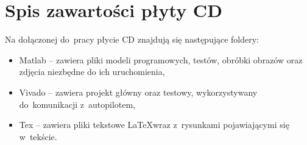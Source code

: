 \documentclass[11pt]{aghdpl}
\begin{document}
% 
% 

\printbibliography

\appendix
\chapter{Spis zawartości płyty CD}
Na dołączonej do~pracy płycie CD znajdują się następujące foldery:
\begin{itemize}
	\item Matlab -- zawiera pliki modeli programowych, testów, obróbki obrazów oraz zdjęcia niezbędne do ich uruchomienia,
	\item Vivado -- zawiera projekt główny oraz testowy, wykorzystywany do~komunikacji z~autopilotem,
	\item Tex -- zawiera pliki tekstowe \LaTeX wraz z~rysunkami pojawiającymi się w~tekście.
\end{itemize}
\end{document}
